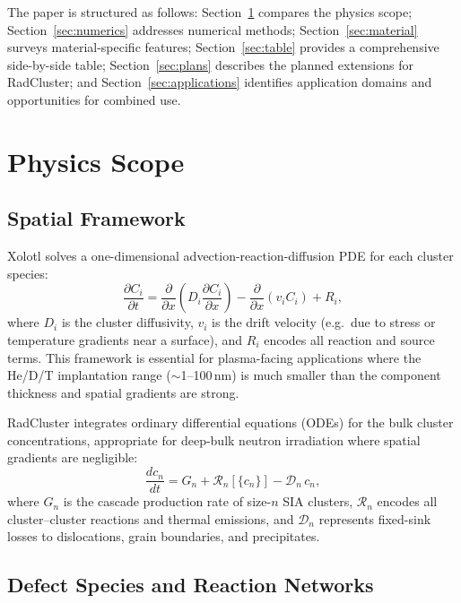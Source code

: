 \documentclass[12pt,letterpaper]{article}
\begin{document}
The paper is structured as follows: Section~\ref{sec:physics} compares
the physics scope; Section~\ref{sec:numerics} addresses numerical
methods; Section~\ref{sec:material} surveys material-specific features;
Section~\ref{sec:table} provides a comprehensive side-by-side table;
Section~\ref{sec:plans} describes the planned extensions for RadCluster;
and Section~\ref{sec:applications} identifies application domains and
opportunities for combined use.

\section{Physics Scope}
\label{sec:physics}

\subsection{Spatial Framework}

Xolotl solves a one-dimensional advection-reaction-diffusion PDE for
each cluster species:
\begin{equation}
  \frac{\partial C_i}{\partial t}
  = \frac{\partial}{\partial x}\!\left(D_i\frac{\partial C_i}{\partial x}\right)
  - \frac{\partial}{\partial x}(v_i C_i)
  + R_i,
  \label{eq:xolotl_ARD}
\end{equation}
where $D_i$ is the cluster diffusivity, $v_i$ is the drift velocity
(e.g.\ due to stress or temperature gradients near a surface), and
$R_i$ encodes all reaction and source terms.  This framework is
essential for plasma-facing applications where the He/D/T implantation
range ($\sim$1--100\,nm) is much smaller than the component thickness
and spatial gradients are strong.

RadCluster integrates ordinary differential equations (ODEs) for the
bulk cluster concentrations, appropriate for deep-bulk neutron
irradiation where spatial gradients are negligible:
\begin{equation}
  \frac{dc_n}{dt} = G_n
    + \mathcal{R}_n[\{c_n\}]
    - \mathcal{D}_n\,c_n,
  \label{eq:RC_ODE}
\end{equation}
where $G_n$ is the cascade production rate of size-$n$ SIA clusters,
$\mathcal{R}_n$ encodes all cluster--cluster reactions and thermal
emissions, and $\mathcal{D}_n$ represents fixed-sink losses to
dislocations, grain boundaries, and precipitates.

\subsection{Defect Species and Reaction Networks}
\end{document}
